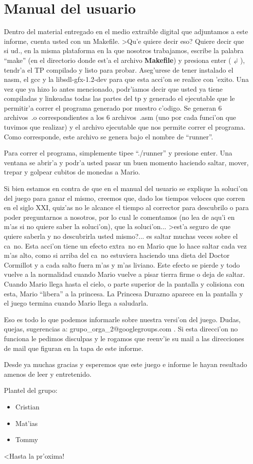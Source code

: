 \section{Manual del usuario}

	Dentro del material entregado en el medio extraible digital que adjuntamos a este informe, 
cuenta usted con un Makefile. >Qu'e quiere decir eso? Quiere decir que si ud., en la misma plataforma
en la que nosotros trabajamos, escribe la palabra ``make'' (en el directorio donde est'a el archivo 
\textbf{Makefile}) y presiona enter ($\dlsh$), tendr'a el TP compilado y listo para probar. Aseg'urese de tener instalado el nasm, el gcc y la libsdl-gfx-1.2-dev para que esta acci'on se realice con 'exito.
	Una vez que ya hizo lo antes mencionado, podr'iamos decir que usted ya tiene compiladas y linkeadas
todas las partes del tp y generado el ejecutable que le permitir'a correr el programa generado por nuestro 
c'odigo. Se generan 6 archivos~.o correspondientes a los 6 archivos~.asm (uno por cada funci'on que tuvimos 
que realizar) y el archivo ejecutable que nos permite correr el programa. Como corresponde, este archivo se 
genera bajo el nombre de ``runner''.

	Para correr el programa, simplemente tipee ``./runner'' y presione enter. Una ventana se abrir'a y 
podr'a usted pasar un buen momento haciendo saltar, mover, trepar y golpear cubitos de monedas a Mario.

	Si bien estamos en contra de que en el manual del usuario se explique la soluci'on del juego para 
ganar el mismo, creemos que, dado los tiempos veloces que corren en el siglo XXI, quiz'as no le alcance el tiempo
al corrector para descubrilo o para poder preguntarnos a nosotros, por lo cual le comentamos (no lea de aqu'i 
en m'as si no quiere saber la soluci'on), que la soluci'on... >est'a seguro de que quiere saberla y no descubrirla 
usted mismo?... es saltar muchas veces sobre el ca~no. Esta acci'on tiene un efecto extra~no en Mario que lo hace
saltar cada vez m'as alto, como si arriba del ca~no estuviera haciendo una dieta del Doctor Cormillot y a cada 
salto fuera m'as y m'as liviano. Este efecto se pierde y todo vuelve a la normalidad cuando Mario vuelve a 
pisar tierra firme o deja de saltar. Cuando Mario llega hasta el cielo, o parte superior de la pantalla y 
colisiona con esta, Mario ``libera'' a la princesa. La Princesa Durazno aparece en la pantalla y el juego termina
cuando Mario llega a saludarla.

	Eso es todo lo que podemos informarle sobre nuestra versi'on del juego. Dudas, quejas, sugerencias a: 
grupo\_orga\_2@googlegroups.com . Si esta direcci'on no funciona le pedimos disculpas y le rogamos que reenv'ie 
su mail a las direcciones de mail que figuran en la tapa de este informe. 

	Desde ya muchas gracias y esperemos que este juego e informe le hayan resultado amenos de leer y 
entretenido.

	Plantel del grupo:
\begin{itemize}
 \item Cristian
 \item Mat'ias
 \item Tommy
\end{itemize}

	<Hasta la pr'oxima!
